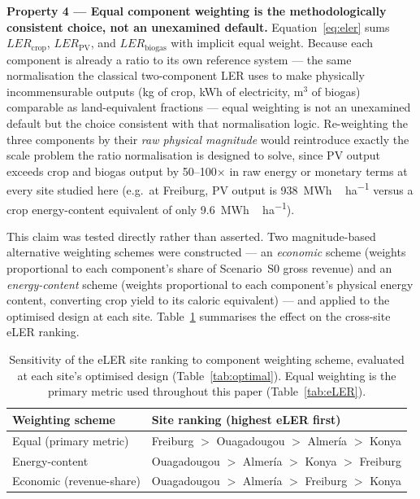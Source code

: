 \textbf{Property 4 --- Equal component weighting is the
	methodologically consistent choice, not an unexamined default.}
Equation~\ref{eq:eler} sums $LER_{\text{crop}}$, $LER_{\text{PV}}$,
and $LER_{\text{biogas}}$ with implicit equal weight. Because each
component is already a ratio to its own reference system --- the
same normalisation the classical two-component LER uses to make
physically incommensurable outputs (kg of crop, kWh of electricity,
m$^3$ of biogas) comparable as land-equivalent fractions --- equal
weighting is not an unexamined default but the choice consistent
with that normalisation logic. Re-weighting the three components by
their \textit{raw physical magnitude} would reintroduce exactly the
scale problem the ratio normalisation is designed to solve, since
PV output exceeds crop and biogas output by 50--100$\times$ in raw
energy or monetary terms at every site studied here (e.g.\ at
Freiburg, PV output is \SI{938}{MWh\,ha^{-1}} versus a crop
energy-content equivalent of only \SI{9.6}{MWh\,ha^{-1}}).

This claim was tested directly rather than asserted. Two
magnitude-based alternative weighting schemes were constructed ---
an \textit{economic} scheme (weights proportional to each
component's share of Scenario~S0 gross revenue) and an
\textit{energy-content} scheme (weights proportional to each
component's physical energy content, converting crop yield to its
caloric equivalent) --- and applied to the optimised design at each
site. Table~\ref{tab:elerweighting} summarises the effect on the
cross-site eLER ranking.

\begin{table}[H]
	\caption{Sensitivity of the eLER site ranking to component
		weighting scheme, evaluated at each site's optimised design
		(Table~\ref{tab:optimal}). Equal weighting is the primary
		metric used throughout this paper (Table~\ref{tab:eLER}).}
	\label{tab:elerweighting}
	\centering
	\begin{tabular}{ll}
		\toprule
		\textbf{Weighting scheme} & \textbf{Site ranking (highest eLER first)} \\
		\midrule
		Equal (primary metric)   & Freiburg $>$ Ouagadougou $>$ Almer\'{i}a $>$ Konya \\
		Energy-content           & Ouagadougou $>$ Almer\'{i}a $>$ Konya $>$ Freiburg \\
		Economic (revenue-share) & Ouagadougou $>$ Almer\'{i}a $>$ Freiburg $>$ Konya \\
		\bottomrule
	\end{tabular}
\end{table}

